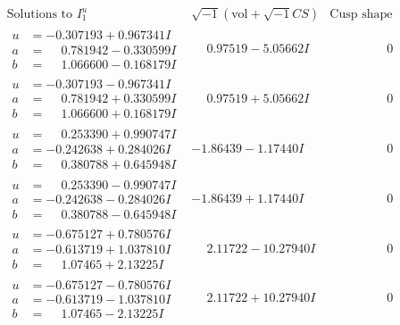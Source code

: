 \documentclass[1p]{elsarticle_modified}
\theoremstyle{definition}
\newcommand{\I}{\sqrt{-1}}
\begin{document}
$$\begin{array}{c|c|c}  
\text{Solutions to }I^u_{1}& \I (\text{vol} + \sqrt{-1}CS) & \text{Cusp shape}\\
 \hline 
\begin{aligned}
u &= -0.307193 + 0.967341 I \\
a &= \phantom{-}0.781942 - 0.330599 I \\
b &= \phantom{-}1.066600 - 0.168179 I\end{aligned}
 & \phantom{-}0.97519 - 5.05662 I & \phantom{-0.000000 } 0 \\ \hline\begin{aligned}
u &= -0.307193 - 0.967341 I \\
a &= \phantom{-}0.781942 + 0.330599 I \\
b &= \phantom{-}1.066600 + 0.168179 I\end{aligned}
 & \phantom{-}0.97519 + 5.05662 I & \phantom{-0.000000 } 0 \\ \hline\begin{aligned}
u &= \phantom{-}0.253390 + 0.990747 I \\
a &= -0.242638 + 0.284026 I \\
b &= \phantom{-}0.380788 + 0.645948 I\end{aligned}
 & -1.86439 - 1.17440 I & \phantom{-0.000000 } 0 \\ \hline\begin{aligned}
u &= \phantom{-}0.253390 - 0.990747 I \\
a &= -0.242638 - 0.284026 I \\
b &= \phantom{-}0.380788 - 0.645948 I\end{aligned}
 & -1.86439 + 1.17440 I & \phantom{-0.000000 } 0 \\ \hline\begin{aligned}
u &= -0.675127 + 0.780576 I \\
a &= -0.613719 + 1.037810 I \\
b &= \phantom{-}1.07465 + 2.13225 I\end{aligned}
 & \phantom{-}2.11722 - 10.27940 I & \phantom{-0.000000 } 0 \\ \hline\begin{aligned}
u &= -0.675127 - 0.780576 I \\
a &= -0.613719 - 1.037810 I \\
b &= \phantom{-}1.07465 - 2.13225 I\end{aligned}
 & \phantom{-}2.11722 + 10.27940 I & \phantom{-0.000000 } 0 \\ \hline\begin{aligned}

\end{aligned}
\end{array}$$
\end{document}
